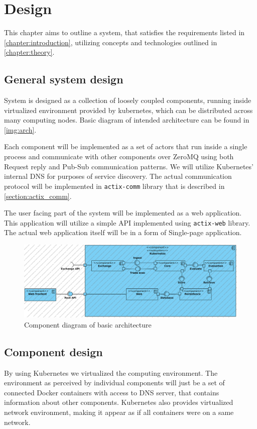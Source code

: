 \chapter{Design}
\label{chapter:design}
This chapter aims to outline a system, that satisfies the requirements listed in \autoref{chapter:introduction}, utilizing
concepts and technologies outlined in \autoref{chapter:theory}.

\section{General system design}
System is designed as a collection of loosely coupled components, running inside virtualized environment provided by kubernetes, which
can be distributed across many computing nodes. Basic diagram of intended architecture can be found in \autoref{img:arch}.

Each component will be implemented as a set of actors that run inside a single process and communicate with other components
over ZeroMQ using both Request reply and Pub-Sub communication patterns. We will utilize Kubernetes' internal DNS for purposes of
service discovery. The actual communication protocol will be implemented in \verb|actix-comm| library that is described in \autoref{section:actix_comm}.

The user facing part of the system will be implemented as a web application. This application will utilize a simple API implemented
using \verb|actix-web| library. The actual web application itself will be in a form of Single-page application.

\begin{figure}[H]
    \includegraphics[width=\textwidth]{obrazky-figures/comp.png}
    \caption{Component diagram of basic architecture}
    \label{img:arch}
\end{figure}


\section{Component design}
By using Kubernetes we virtualized the computing environment. The environment as perceived by individual components
will just be a set of connected Docker containers with access to DNS server, that contains information about other components.
Kubernetes also provides virtualized network environment, making it appear as if all containers were on a same network.

